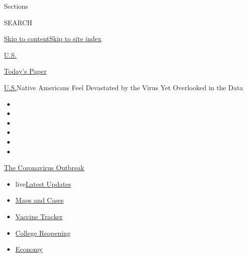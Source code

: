 Sections

SEARCH

\protect\hyperlink{site-content}{Skip to
content}\protect\hyperlink{site-index}{Skip to site index}

\href{https://www.nytimes3xbfgragh.onion/section/us}{U.S.}

\href{https://myaccount.nytimes3xbfgragh.onion/auth/login?response_type=cookie\&client_id=vi}{}

\href{https://www.nytimes3xbfgragh.onion/section/todayspaper}{Today's
Paper}

\href{/section/us}{U.S.}\textbar{}Native Americans Feel Devastated by
the Virus Yet Overlooked in the Data

\begin{itemize}
\item
\item
\item
\item
\item
\item
\end{itemize}

\href{https://www.nytimes3xbfgragh.onion/news-event/coronavirus?action=click\&pgtype=Article\&state=default\&region=TOP_BANNER\&context=storylines_menu}{The
Coronavirus Outbreak}

\begin{itemize}
\tightlist
\item
  live\href{https://www.nytimes3xbfgragh.onion/2020/08/04/world/coronavirus-cases.html?action=click\&pgtype=Article\&state=default\&region=TOP_BANNER\&context=storylines_menu}{Latest
  Updates}
\item
  \href{https://www.nytimes3xbfgragh.onion/interactive/2020/us/coronavirus-us-cases.html?action=click\&pgtype=Article\&state=default\&region=TOP_BANNER\&context=storylines_menu}{Maps
  and Cases}
\item
  \href{https://www.nytimes3xbfgragh.onion/interactive/2020/science/coronavirus-vaccine-tracker.html?action=click\&pgtype=Article\&state=default\&region=TOP_BANNER\&context=storylines_menu}{Vaccine
  Tracker}
\item
  \href{https://www.nytimes3xbfgragh.onion/2020/08/02/us/covid-college-reopening.html?action=click\&pgtype=Article\&state=default\&region=TOP_BANNER\&context=storylines_menu}{College
  Reopening}
\item
  \href{https://www.nytimes3xbfgragh.onion/live/2020/08/04/business/stock-market-today-coronavirus?action=click\&pgtype=Article\&state=default\&region=TOP_BANNER\&context=storylines_menu}{Economy}
\end{itemize}

